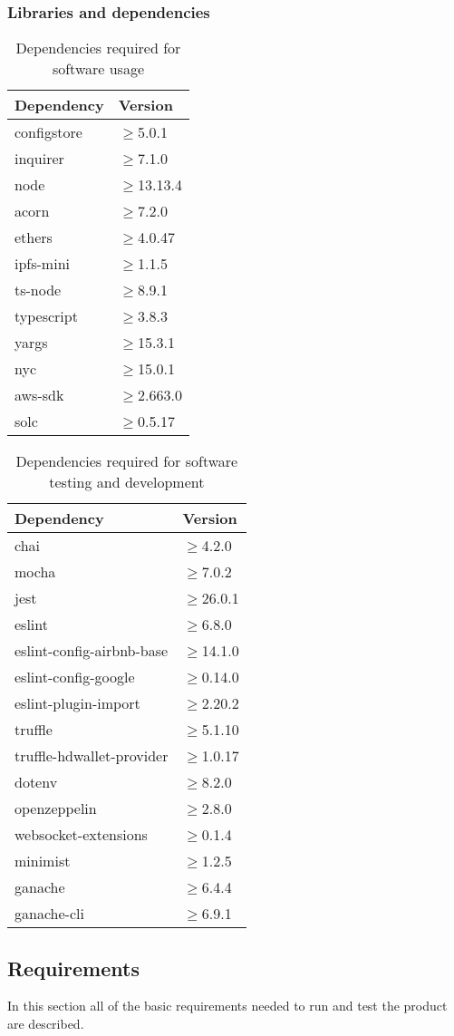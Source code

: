 \subsubsection{Libraries and dependencies}
\begin{longtable}[h!]{
		>{\centering\arraybackslash}p{}
		>{\centering\arraybackslash}p{} }
	\caption{Dependencies required for software usage} \\

	\textbf{\color{white}Dependency} &
	\textbf{\color{white}Version}
	\tabularnewline
	\endhead

	configstore & $\geq$5.0.1 \tabularnewline
	inquirer & $\geq$7.1.0 \tabularnewline
	node & $\geq$13.13.4 \tabularnewline
	acorn & $\geq$7.2.0 \tabularnewline
	ethers & $\geq$4.0.47 \tabularnewline
	ipfs-mini & $\geq$1.1.5 \tabularnewline
	ts-node & $\geq$8.9.1 \tabularnewline
	typescript & $\geq$3.8.3 \tabularnewline
	yargs & $\geq$15.3.1 \tabularnewline
	nyc & $\geq$15.0.1 \tabularnewline
	aws-sdk & $\geq$2.663.0 \tabularnewline
	solc & $\geq$0.5.17 \tabularnewline

\end{longtable}
\begin{longtable}{
		>{\centering\arraybackslash}p{}
		>{\centering\arraybackslash}p{} }
	\caption{Dependencies required for software testing and development} \\

	\textbf{\color{white}Dependency} &
	\textbf{\color{white}Version}
	\tabularnewline
	\endhead

	chai & $\geq$4.2.0 \tabularnewline
	mocha & $\geq$7.0.2 \tabularnewline
	jest & $\geq$26.0.1 \tabularnewline
	eslint & $\geq$6.8.0 \tabularnewline
	eslint-config-airbnb-base & $\geq$14.1.0 \tabularnewline
	eslint-config-google & $\geq$0.14.0 \tabularnewline
	eslint-plugin-import & $\geq$2.20.2 \tabularnewline
	truffle & $\geq$5.1.10 \tabularnewline
	truffle-hdwallet-provider & $\geq$1.0.17 \tabularnewline
	dotenv & $\geq$8.2.0 \tabularnewline
	openzeppelin & $\geq$2.8.0 \tabularnewline
	websocket-extensions & $\geq$0.1.4 \tabularnewline
	minimist & $\geq$1.2.5 \tabularnewline
	ganache & $\geq$6.4.4 \tabularnewline
	ganache-cli & $\geq$6.9.1 \tabularnewline

\end{longtable}
\subsection{Requirements}
In this section all of the basic requirements needed to run and test the product are described.

